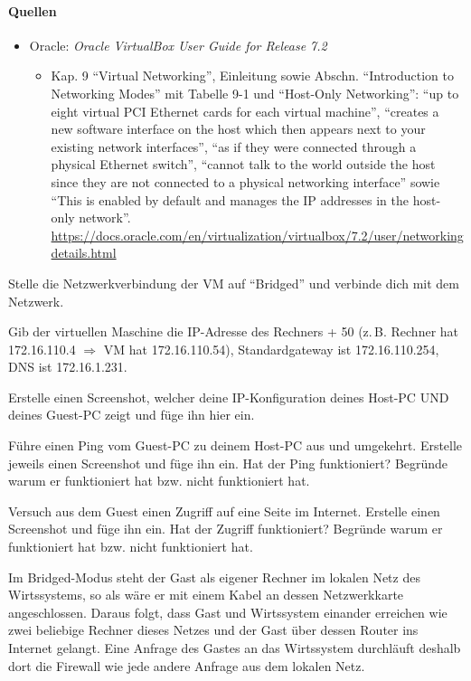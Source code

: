 \paragraph{Quellen}
\begin{itemize}[quellen]
  \item Oracle: \emph{Oracle VirtualBox User Guide for Release 7.2}
  \begin{itemize}[nosep]
    \item Kap. 9 \enquote{Virtual Networking}, Einleitung sowie Abschn. \enquote{Introduction to Networking Modes} mit Tabelle 9-1 und \enquote{Host-Only Networking}: \enquote{up to eight virtual PCI Ethernet cards for each virtual machine}, \enquote{creates a new software interface on the host which then appears next to your existing network interfaces}, \enquote{as if they were connected through a physical Ethernet switch}, \enquote{cannot talk to the world outside the host since they are not connected to a physical networking interface} sowie \enquote{This is enabled by default and manages the IP addresses in the host-only network}. \url{https://docs.oracle.com/en/virtualization/virtualbox/7.2/user/networkingdetails.html}
  \end{itemize}
\end{itemize}

\begin{aufgabe}
Stelle die Netzwerkverbindung der VM auf \enquote{Bridged} und verbinde dich mit dem Netzwerk.

Gib der virtuellen Maschine die IP-Adresse des Rechners + 50 (z.\,B. Rechner hat 172.16.110.4 $\Rightarrow$ VM hat 172.16.110.54), Standardgateway ist 172.16.110.254, DNS ist 172.16.1.231.

Erstelle einen Screenshot, welcher deine IP-Konfiguration deines Host-PC UND deines Guest-PC zeigt und füge ihn hier ein.

Führe einen Ping vom Guest-PC zu deinem Host-PC aus und umgekehrt. Erstelle jeweils einen Screenshot und füge ihn ein. Hat der Ping funktioniert? Begründe warum er funktioniert hat bzw. nicht funktioniert hat.

Versuch aus dem Guest einen Zugriff auf eine Seite im Internet. Erstelle einen Screenshot und füge ihn ein. Hat der Zugriff funktioniert? Begründe warum er funktioniert hat bzw. nicht funktioniert hat.
\end{aufgabe}
\label{sec:bridged-konfig}

Im Bridged-Modus steht der Gast als eigener Rechner im lokalen Netz des Wirtssystems, so als wäre er mit einem Kabel an dessen Netzwerkkarte angeschlossen. Daraus folgt, dass Gast und Wirtssystem einander erreichen wie zwei beliebige Rechner dieses Netzes und der Gast über dessen Router ins Internet gelangt. Eine Anfrage des Gastes an das Wirtssystem durchläuft deshalb dort die Firewall wie jede andere Anfrage aus dem lokalen Netz.

